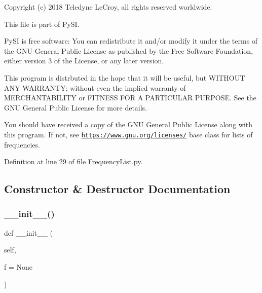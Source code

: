 Copyright (c) 2018 Teledyne Le\+Croy, all rights reserved worldwide.

This file is part of Py\+SI.

Py\+SI is free software\+: You can redistribute it and/or modify it under the terms of the G\+NU General Public License as published by the Free Software Foundation, either version 3 of the License, or any later version.

This program is distrbuted in the hope that it will be useful, but W\+I\+T\+H\+O\+UT A\+NY W\+A\+R\+R\+A\+N\+TY; without even the implied warranty of M\+E\+R\+C\+H\+A\+N\+T\+A\+B\+I\+L\+I\+TY or F\+I\+T\+N\+E\+SS F\+OR A P\+A\+R\+T\+I\+C\+U\+L\+AR P\+U\+R\+P\+O\+SE. See the G\+NU General Public License for more details.

You should have received a copy of the G\+NU General Public License along with this program. If not, see \href{https://www.gnu.org/licenses/}{\tt https\+://www.\+gnu.\+org/licenses/} base class for lists of frequencies. 

Definition at line 29 of file Frequency\+List.\+py.



\subsection{Constructor \& Destructor Documentation}
\mbox{\label{classSignalIntegrity_1_1FrequencyDomain_1_1FrequencyList_1_1FrequencyList_a8e9ec4f7f7796f2f07894cd60aeecdcd}} 
\subsubsection{\texorpdfstring{\+\_\+\+\_\+init\+\_\+\+\_\+()}{\_\_init\_\_()}}
{\footnotesize\ttfamily def \+\_\+\+\_\+init\+\_\+\+\_\+ (\begin{DoxyParamCaption}\item[{}]{self,  }\item[{}]{f = {\ttfamily None} }\end{DoxyParamCaption})}



